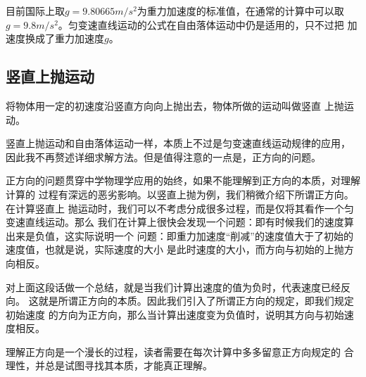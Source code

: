 目前国际上取$g=9.80665m/s^2$为重力加速度的标准值，在通常的计算中可以取
$g=9.8m/s^2$。匀变速直线运动的公式在自由落体运动中仍是适用的，只不过把
加速度换成了重力加速度$g$。
\subsection{竖直上抛运动}
\begin{definition}
    将物体用一定的初速度沿竖直方向向上抛出去，物体所做的运动叫做竖直
    上抛运动。
\end{definition}

竖直上抛运动和自由落体运动一样，本质上不过是匀变速直线运动规律的应用，
因此我不再赘述详细求解方法。但是值得注意的一点是，正方向的问题。

正方向的问题贯穿中学物理学应用的始终，如果不能理解到正方向的本质，对理解计算的
过程有深远的恶劣影响。以竖直上抛为例，我们稍微介绍下所谓正方向。在计算竖直上
抛运动时，我们可以不考虑分成很多过程，而是仅将其看作一个匀变速直线运动。那么 
我们在计算上很快会发现一个问题：即有时候我们的速度算出来是负值，这实际说明一个
问题：即重力加速度“削减”的速度值大于了初始的速度值，也就是说，实际速度的大小
是此时速度的大小，而方向与初始的上抛方向相反。

对上面这段话做一个总结，就是当我们计算出速度的值为负时，代表速度已经反向。
这就是所谓正方向的本质。因此我们引入了所谓正方向的规定，即我们规定初始速度
的方向为正方向，那么当计算出速度变为负值时，说明其方向与初始速度相反。

理解正方向是一个漫长的过程，读者需要在每次计算中多多留意正方向规定的
合理性，并总是试图寻找其本质，才能真正理解。